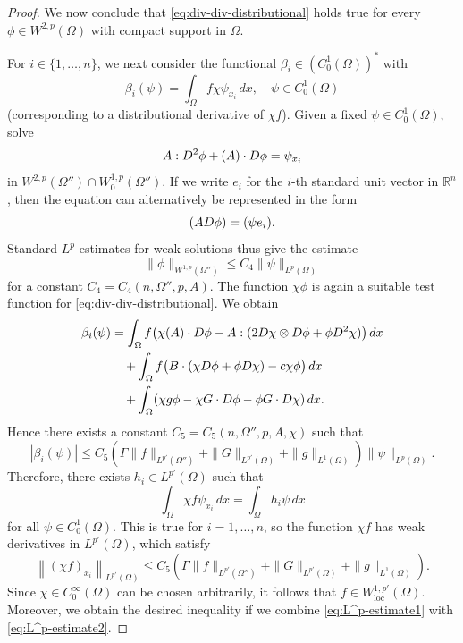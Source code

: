 \documentclass[a4paper]{article}
\newcommand{\R}{\mathbb{R}}
\newcommand{\loc}{\mathrm{loc}}
\let\div\relax\DeclareMathOperator{\div}{div}
\theoremstyle{remark}
\begin{document}
\begin{proof}
We now conclude that \eqref{eq:div-div-distributional} holds
true for every $\phi \in W^{2, p}(\Omega)$ with compact support in $\Omega$.

For $i \in \{1, \dotsc, n\}$, we next consider the functional $\beta_i \in (C_0^1(\Omega))^*$ with
\[
\beta_i(\psi) = \int_\Omega f \chi \psi_{x_i} \, dx, \quad \psi \in C_0^1(\Omega)
\]
(corresponding to a distributional derivative of $\chi f$).
Given a fixed $\psi \in C_0^1(\Omega)$, solve
\[
A : D^2\phi + (\div A) \cdot D\phi = \psi_{x_i}
\]
in $W^{2, p}(\Omega'') \cap W_0^{1, p}(\Omega'')$. If we write $e_i$ for
the $i$-th standard unit vector in $\R^n$, then the equation can alternatively
be represented in the form
\[
\div(A D\phi) = \div(\psi e_i).
\]
Standard $L^p$-estimates for weak solutions thus give the estimate
\[
\|\phi\|_{W^{1, p}(\Omega'')} \le C_4 \|\psi\|_{L^p(\Omega)}
\]
for a constant $C_4 = C_4(n, \Omega'', p, A)$.
The function $\chi\phi$ is again a suitable test function for
\eqref{eq:div-div-distributional}. We obtain
\[
\begin{split}
\beta_i(\psi) & = \int_\Omega f \bigl(\chi (\div A) \cdot D\phi - A : (2D\chi \otimes D\phi + \phi D^2 \chi)\bigr) \, dx \\
& \quad + \int_\Omega f \bigl(B \cdot (\chi D\phi + \phi D\chi) - c \chi\phi\bigr) \, dx \\
& \quad + \int_\Omega (\chi g \phi - \chi G \cdot D\phi - \phi G \cdot D\chi) \, dx.
\end{split}
\]
Hence there exists a constant $C_5 = C_5(n, \Omega'', p, A, \chi)$ such that
\[
|\beta_i(\psi)| \le C_5 \left(\Gamma \|f\|_{L^{p'}(\Omega'')} + \|G\|_{L^{p'}(\Omega)} + \|g\|_{L^1(\Omega)}\right) \|\psi\|_{L^p(\Omega)}.
\]
Therefore, there exists $h_i \in L^{p'}(\Omega)$ such that
\[
\int_\Omega \chi f \psi_{x_i} \, dx = \int_\Omega h_i \psi \, dx
\]
for all $\psi \in C_0^1(\Omega)$.
This is true for $i = 1, \dots, n$, so the function $\chi f$ has weak derivatives in $L^{p'}(\Omega)$, which satisfy
\begin{equation} \label{eq:L^p-estimate2}
\left\|(\chi f)_{x_i}\right\|_{L^{p'}(\Omega)} \le C_5 \left(\Gamma \|f\|_{L^{p'}(\Omega'')} + \|G\|_{L^{p'}(\Omega)} + \|g\|_{L^1(\Omega)}\right).
\end{equation}
Since $\chi \in C_0^\infty(\Omega)$ can be chosen arbitrarily,
it follows that $f \in W_\loc^{1, p'}(\Omega)$. Moreover, we obtain
the desired inequality if we combine \eqref{eq:L^p-estimate1} with
\eqref{eq:L^p-estimate2}.
\end{proof}
\end{document}
